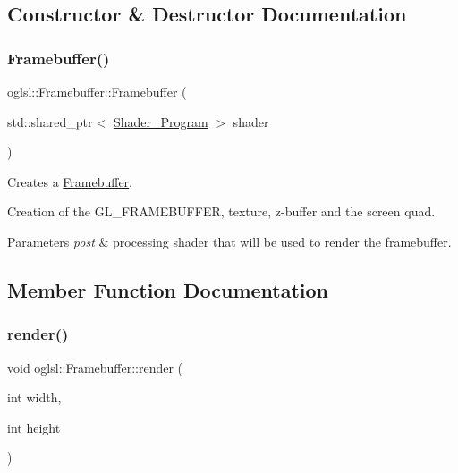 \subsection{Constructor \& Destructor Documentation}
\mbox{\label{classoglsl_1_1_framebuffer_a69506454416fe0134814dade467e147e}} 
\subsubsection{\texorpdfstring{Framebuffer()}{Framebuffer()}}
{\footnotesize\ttfamily oglsl\+::\+Framebuffer\+::\+Framebuffer (\begin{DoxyParamCaption}\item[{std\+::shared\+\_\+ptr$<$ \mbox{\hyperlink{classoglsl_1_1_shader___program}{Shader\+\_\+\+Program}} $>$}]{shader }\end{DoxyParamCaption})}



Creates a \mbox{\hyperlink{classoglsl_1_1_framebuffer}{Framebuffer}}. 

Creation of the G\+L\+\_\+\+F\+R\+A\+M\+E\+B\+U\+F\+F\+ER, texture, z-\/buffer and the screen quad. 
\begin{DoxyParams}{Parameters}
{\em post} & processing shader that will be used to render the framebuffer. \\
\hline
\end{DoxyParams}


\subsection{Member Function Documentation}
\mbox{\label{classoglsl_1_1_framebuffer_a628dd0fb23006b139c75786a3d7da1a6}} 
\subsubsection{\texorpdfstring{render()}{render()}}
{\footnotesize\ttfamily void oglsl\+::\+Framebuffer\+::render (\begin{DoxyParamCaption}\item[{int}]{width,  }\item[{int}]{height }\end{DoxyParamCaption})}



